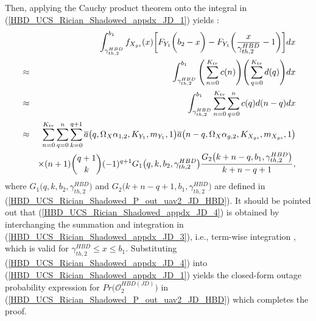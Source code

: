 Then, applying the Cauchy product theorem onto the integral in (\ref{HBD_UCS_Rician_Shadowed_appdx_JD_1}) yields \cite{andras2011generalized,amann2005analysis}:
\begin{eqnarray}
 & & \hspace{-2cm} \int_{\gamma_{th,2}^{HBD}}^{b_1} f_{X_{gs}}(x)\bigg[ F_{Y_1}\bigg(b_2 - x\bigg)- F_{Y_1}\bigg(\frac{x}{\gamma_{th,2}^{HBD}}-1\bigg) \bigg] dx \nonumber \\
 & \approx & \int_{\gamma_{th,2}^{HBD}}^{b_1} \Bigg( \sum_{n=0}^{K_{tr}} c(n) \Bigg) \Bigg( \sum_{q=0}^{K_{tr}} d(q)\Bigg) dx \nonumber\\
 & \approx & \int_{\gamma_{th,2}^{HBD}}^{b_1} \sum_{n=0}^{K_{tr}} \sum_{q=0}^{n} c(q) d(n-q) dx \label{HBD_UCS_Rician_Shadowed_appdx_JD_3}\\
 & \approx & \sum_{n=0}^{K_{tr}}\sum_{q=0}^{n}\sum_{k=0}^{q+1} \overline{a}\big(q,\Omega_X\alpha_{1,2},K_{Y_1},m_{Y_1},1\big) \overline{a}\big(n-q,\Omega_X\alpha_{g,2},K_{X_{gs}},m_{X_{gs}},1\big) \nonumber\\
 & & \times (n+1) \binom{q+1}{k}(-1)^{q+1} G_1\big(q,k,b_2,\gamma_{th,2}^{HBD}\big) \frac{G_2\big(k+n-q,b_1,\gamma_{th,2}^{HBD}\big)}{k+n-q+1}, \label{HBD_UCS_Rician_Shadowed_appdx_JD_4}
\end{eqnarray}
where $G_1\big(q,k,b_2,\gamma_{th,2}^{HBD}\big)$ and $G_2\big(k+n-q+1,b_1,\gamma_{th,2}^{HBD}\big)$ are defined in (\ref{HBD_UCS_Rician_Shadowed_P_out_uav2_JD_HBD}). It should be pointed out that (\ref{HBD_UCS_Rician_Shadowed_appdx_JD_4}) is obtained by interchanging the summation and integration in (\ref{HBD_UCS_Rician_Shadowed_appdx_JD_3}), i.e., term-wise integration \cite{gradshteyn2014table}, which is valid for $ \gamma_{th,2}^{HBD} \leq x \leq b_1 $. Substituting (\ref{HBD_UCS_Rician_Shadowed_appdx_JD_4}) into (\ref{HBD_UCS_Rician_Shadowed_appdx_JD_1}) yields the closed-form outage probability expression for $Pr\big(\mathcal{O}_{2}^{HBD(JD)}\big)$ in (\ref{HBD_UCS_Rician_Shadowed_P_out_uav2_JD_HBD}) which completes the proof.

